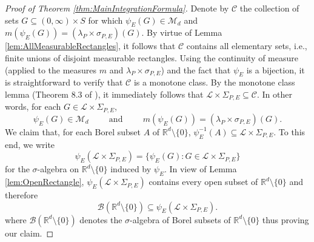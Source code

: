\documentclass[11pt, letter]{book}
\begin{document}
\begin{proof}[Proof of Theorem \ref{thm:MainIntegrationFormula}]
Denote by $\mathcal{C}$ the collection of sets $G\subseteq (0,\infty)\times S$ for which $\psi_E(G)\in \mathcal{M}_d$ and $m(\psi_E(G))=(\lambda_P\times\sigma_{P,E})(G).$ By virtue of Lemma \ref{lem:AllMeasurableRectangles}, it follows that $\mathcal{C}$ contains all elementary sets, i.e., finite unions of disjoint measurable rectangles. Using the continuity of measure (applied to the measures $m$ and $\lambda_P\times\sigma_{P,E}$) and the fact that $\psi_E$ is a bijection, it is straightforward to verify that $\mathcal{C}$ is a monotone class. By the monotone class lemma (Theorem 8.3 of \cite{rudin_real_1987}), it immediately follows that $\mathcal{L}\times\Sigma_{P,E}\subseteq\mathcal{C}$. In other words, for each $G\in\mathcal{L}\times\Sigma_{P,E}$,
\begin{equation}\label{eq:Good1}
\psi_E(G)\in\mathcal{M}_d\hspace{1cm}\mbox{and}\hspace{1cm}m(\psi_E(G))=(\lambda_P\times\sigma_{P,E})(G).
\end{equation}
We claim that, for each Borel subset $A$ of $\mathbb{R}^d\setminus\{0\}$, $\psi_E^{-1}(A)\subseteq \mathcal{L}\times\Sigma_{P,E}$. To this end, we write
\begin{equation*}
\psi_E(\mathcal{L}\times\Sigma_{P,E})=\{\psi_E(G):G\in\mathcal{L}\times\Sigma_{P,E}\}
\end{equation*}
for the $\sigma$-algebra on $\mathbb{R}^d\setminus\{0\}$ induced by $\psi_E$. In view of Lemma \ref{lem:OpenRectangle}, $\psi_E(\mathcal{L}\times\Sigma_{P,E})$ contains every open subset of $\mathbb{R}^d\setminus\{0\}$ and therefore
\begin{equation*}
\mathcal{B}(\mathbb{R}^d\setminus\{0\})\subseteq\psi_E(\mathcal{L}\times\Sigma_{P,E}).
\end{equation*}
where $\mathcal{B}(\mathbb{R}^d\setminus\{0\})$ denotes the $\sigma$-algebra of Borel subsets of $\mathbb{R}^d\setminus\{0\}$ thus proving our claim. 


\end{proof}
\end{document}
